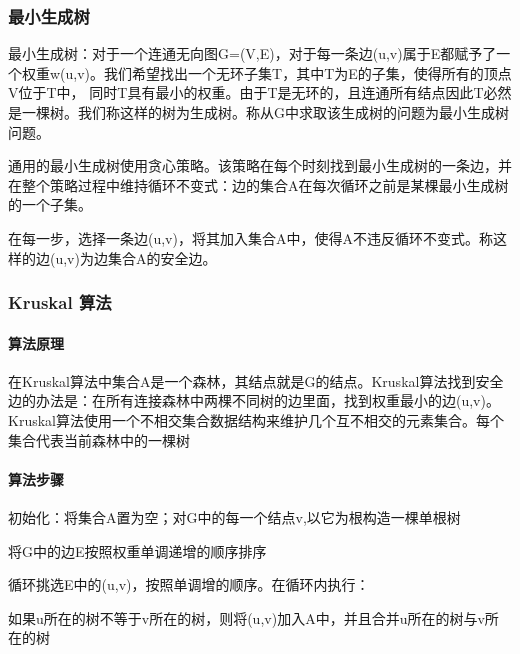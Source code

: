 \subsubsection*{最小生成树}

最小生成树：对于一个连通无向图\+G=(V,E)，对于每一条边(u,v)属于\+E都赋予了一个权重w(u,v)。我们希望找出一个无环子集\+T，其中\+T为\+E的子集，使得所有的顶点\+V位于\+T中， 同时\+T具有最小的权重。由于\+T是无环的，且连通所有结点因此\+T必然是一棵树。我们称这样的树为生成树。称从\+G中求取该生成树的问题为最小生成树问题。

通用的最小生成树使用贪心策略。该策略在每个时刻找到最小生成树的一条边，并在整个策略过程中维持循环不变式：边的集合\+A在每次循环之前是某棵最小生成树的一个子集。

在每一步，选择一条边(u,v)，将其加入集合\+A中，使得\+A不违反循环不变式。称这样的边(u,v)为边集合\+A的安全边。

\subsubsection*{Kruskal 算法}

\paragraph*{算法原理}

在\+Kruskal算法中集合\+A是一个森林，其结点就是\+G的结点。\+Kruskal算法找到安全边的办法是：在所有连接森林中两棵不同树的边里面，找到权重最小的边(u,v)。 Kruskal算法使用一个不相交集合数据结构来维护几个互不相交的元素集合。每个集合代表当前森林中的一棵树

\paragraph*{算法步骤}


\begin{DoxyItemize}
\item 初始化：将集合\+A置为空；对\+G中的每一个结点v,以它为根构造一棵单根树
\item 将\+G中的边\+E按照权重单调递增的顺序排序
\item 循环挑选\+E中的(u,v)，按照单调增的顺序。在循环内执行：
\begin{DoxyItemize}
\item 如果u所在的树不等于v所在的树，则将(u,v)加入\+A中，并且合并u所在的树与v所在的树
\end{DoxyItemize}
\end{DoxyItemize}

